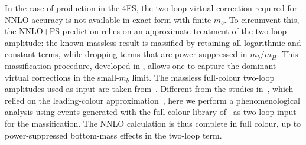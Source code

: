 \documentclass[11pt,a4paper]{article}
\begin{document}
In the case of \bbH{} production in the 4FS, the two-loop virtual correction required for NNLO accuracy is not available in exact form with finite \(m_b\). To circumvent this, the NNLO+PS prediction relies on an approximate treatment of the two-loop amplitude: the known massless result is massified by retaining all logarithmic and constant terms, while dropping terms that are power-suppressed in \(m_b / m_{H}\). This massification procedure, developed in , allows one to capture the dominant virtual corrections in the small-\(m_b\) limit. The massless full-colour two-loop amplitudes used as input are taken from~. Different from the studies in~, which relied on the leading-colour approximation~\cite{badger:2021ega}, here we perform a phenomenological analysis using events generated with the full-colour library of~ as two-loop input for the massification. The NNLO calculation is thus complete in full colour, up to power-suppressed bottom-mass effects in the two-loop term.
\end{document}
